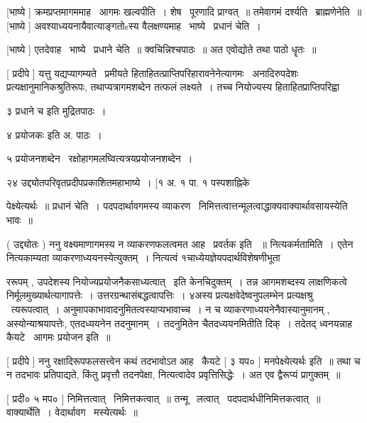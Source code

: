 \documentclass[11pt, openany]{book}
\begin{document}
 [भाष्ये ] क्रमप्रप्तमागममाह \textendash\ आगमः खल्वपीति~। शेष \textendash\ पूरणादि
प्राग्वत्~॥ तमेवागमं दर्श्यति \textendash\ ब्राह्मणेनेति~॥ [भाष्ये ]
अवश्याध्ययनायैवात्याङ्गतोsस्य वैलक्षण्यमाह \textendash\ भाष्ये \textendash\ प्रधानं चेति~। 

 [भाष्ये ] एतदेवाह \textendash\ भाष्ये \textendash\ प्रधाने चेति~॥ क्वचिन्निश्चपाठः~॥ अत
एवोद्योते तथा पाठो धॄतः~॥ 

 [ प्रदीपे ] यत्तु यद्यप्यागम्यते \textendash\ प्रमीयते
हिताहितत्प्राप्तिपरिहारावनेनेत्यागमः \textendash\ अनादिरुपदेशः
प्रत्यक्षानुमानिकश्रुतिरूपः, तथाप्यत्रागमशब्देन तत्फलं लक्ष्यते~। तच्च
नियोज्यस्य हिताहितप्राप्तिपरिह्वा



३ {\qt प्रधाने च} इति मुद्रितपाठः~। 

४ {\qt प्रयोजकः} इति अ. पाठः~। 

५ प्रयोजनशब्देन \textendash\ रक्षोहागमलघ्वित्यत्रयप्रयोजनशब्देन~। 

२४ उद्द्योतपरिवृतप्रदीपप्रकाशितमहाभाष्ये~। [१ अ. १ पा. १ पस्पशाह्निके




पेक्ष्येत्यर्थः~॥ प्रधानं चेति~। पदपदार्थावगमस्य व्याकरण \textendash\ 
निमित्तत्वात्तन्मूलत्वाद्धाक्यवाक्यार्थावसायस्येति भावः~॥ 

 ( उद्द्योतः ) ननु वक्ष्यमाणागमस्य न व्याकरणफलत्वमत आह \textendash\ प्रवर्तक इति
~॥ नित्यकर्मतामिति~। एतेन नित्यकाम्यता व्याकरणाध्ययनस्येत्युक्तम्~। 
नित्यत्वं १चाध्येयज्ञेयपदार्थविशेषणीभूता \textendash\ 



ररूपम् , उपदेशस्य नियोज्यप्रयोजनैकसाध्यत्वात् \textendash\ इति केनचिदुक्तम्~। तन्न
आगमशब्दस्य लाक्षणिकत्वे निर्मूलमुख्यार्थत्यागापत्तेः~। 
उत्तरग्रन्थासंबद्धत्वापत्तिः~। ४अस्य प्रत्यक्षवेदेष्वनुपलम्भेन
प्रत्यक्षश्रु \textendash\ त्यरूपत्वात्~। अनुमापकाभावादनुमितत्वस्याप्यभावाच्च~। न च
व्याकरणाध्ययनेनैवास्यानुमानम् , अस्योन्याश्रयापत्तेः, एतदध्ययनेन
तदनुमानम्~। तदनुमितेन चैतदध्ययनमितीति दिक्~। तदेतद् ध्वनयन्नाह
कैयटे \textendash\ आगमः प्रयोजन इति~॥ 

 [ प्रदीपे ] ननु रक्षादिरूपफलसत्त्वेन कथं तदभावोऽत आह \textendash\ कैयटे
[ ३ यप० ] मनपेक्ष्येत्यर्थः इति~॥ तथा च न तदभावः प्रतिपाद्यते,
किंतु प्रवृत्तौ तदनपेक्षा, नित्यत्वादेव प्रवृत्तिसिद्धेः~। अत एव
द्वैरूप्यं प्रागुक्तम्~॥ 

 [ प्रदी० ५ मप० ] निमित्तत्वात् \textendash\ निमित्तकत्वात्~॥ तन्मू \textendash\ 
लत्वात् \textendash\ पदपदार्थधीनिमित्तकत्वात्~॥ वाक्यार्थेति~। वेदार्थावग \textendash\ 
मस्येत्यर्थः~॥ 
\end{document}
